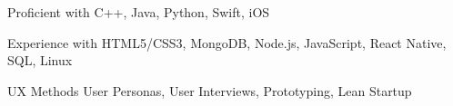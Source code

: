 

\begin{cvskills}
	
	\cvskill
	{Proficient with} %
	{C++, Java, Python, Swift, iOS} %

	\cvskill
	{Experience with} %
	{HTML5/CSS3, MongoDB, Node.js, JavaScript, React Native, SQL, Linux} %
	
	\cvskill
	{UX Methods} %
	{User Personas, User Interviews, Prototyping, Lean Startup} %
	
	
\end{cvskills}
